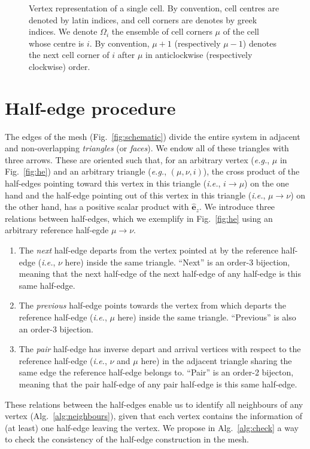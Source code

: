 \documentclass[aps, superscriptaddress, notitlepage]{revtex4-1}
\def\scale{0.8}
\begin{document}
\begin{figure}[!t]
\begin{tikzpicture}[scale=\scale]
\end{tikzpicture}
\caption{Vertex representation of a single cell. By convention, cell centres are denoted by latin indices, and cell corners are denotes by greek indices. We denote $\Omega_i$ the ensemble of cell corners $\mu$ of the cell whose centre is $i$. By convention, $\mu + 1$ (respectively $\mu - 1$) denotes the next cell corner of $i$ after $\mu$ in anticlockwise (respectively clockwise) order.}
\label{fig:fmu}
\end{figure}

\section{Half-edge procedure}

The edges of the mesh (Fig.~\ref{fig:schematic}) divide the entire system in adjacent and non-overlapping \textit{triangles} (or \textit{faces}). We endow all of these triangles with three arrows. These are oriented such that, for an arbitrary vertex (\textit{e.g.}, $\mu$ in Fig.~\ref{fig:he}) and an arbitrary triangle (\textit{e.g.}, $(\mu, \nu, i)$), the cross product of the half-edges pointing toward this vertex in this triangle (\textit{i.e.}, $i \to \mu$) on the one hand and the half-edge pointing out of this vertex in this triangle (\textit{i.e.}, $\mu \to \nu$) on the other hand, has a positive scalar product with $\hat{\boldsymbol{e}}_z$. We introduce three relations between half-edges, which we exemplify in Fig.~\ref{fig:he} using an arbitrary {\color{yellow} reference half-egde $\mu \to \nu$}.
\begin{enumerate}
    \item The {\color{purple} \textit{next} half-edge} departs from the vertex pointed at by the reference half-edge (\textit{i.e.}, $\nu$ here) inside the same triangle. ``Next'' is an order-3 bijection, meaning that the next half-edge of the next half-edge of any half-edge is this same half-edge.
    \item The {\color{green} \textit{previous} half-edge} points towards the vertex from which departs the reference half-edge (\textit{i.e.}, $\mu$ here) inside the same triangle. ``Previous'' is also an order-3 bijection.
    \item The {\color{blue} \textit{pair} half-edge} has inverse depart and arrival vertices with respect to the reference half-edge (\textit{i.e.}, $\nu$ and $\mu$ here) in the adjacent triangle sharing the same edge the reference half-edge belongs to. ``Pair'' is an order-2 bijecton, meaning that the pair half-edge of any pair half-edge is this same half-edge.
\end{enumerate}
These relations between the half-edges enable us to identify all neighbours of any vertex (Alg.~\ref{alg:neighbours}), given that each vertex contains the information of (at least) one half-edge leaving the vertex. We propose in Alg.~\ref{alg:check} a way to check the consistency of the half-edge construction in the mesh.
\end{document}
